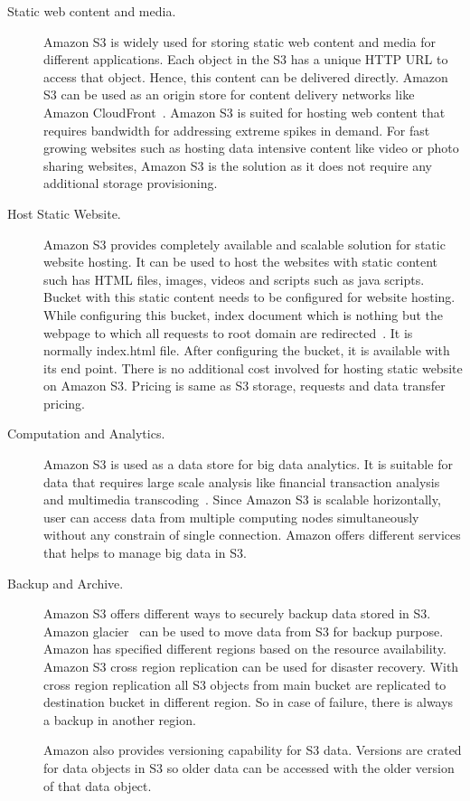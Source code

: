 \begin{description}
\item [Static web content and media.] Amazon S3 is widely used for
  storing static web content and media for different
  applications. Each object in the S3 has a unique HTTP URL to access
  that object. Hence, this content can be delivered directly. Amazon
  S3 can be used as an origin store for content delivery networks like
  Amazon CloudFront~\cite{hid-sp18-420-amazon-cloudfront}.  Amazon S3
  is suited for hosting web content that requires bandwidth for
  addressing extreme spikes in demand. For fast growing websites such
  as hosting data intensive content like video or photo sharing
  websites, Amazon S3 is the solution as it does not require any
  additional storage provisioning.



\item [Host Static Website.] Amazon S3 provides completely available
  and scalable solution for static website hosting. It can be used to
  host the websites with static content such has HTML files, images,
  videos and scripts such as java scripts.  Bucket with this static
  content needs to be configured for website hosting.  While
  configuring this bucket, index document which is nothing but the
  webpage to which all requests to root domain are
  redirected~\cite{hid-sp18-420-amazon-S3-details}. It is normally
  index.html file.  After configuring the bucket, it is available with
  its end point. There is no additional cost involved for hosting
  static website on Amazon S3. Pricing is same as S3 storage, requests
  and data transfer pricing.


\item [Computation and Analytics.] Amazon S3 is used as a data store
  for big data analytics. It is suitable for data that requires large
  scale analysis like financial transaction analysis and multimedia
  transcoding~\cite{hid-sp18-420-amazon-S3-FAQ}.  Since Amazon S3 is
  scalable horizontally, user can access data from multiple computing
  nodes simultaneously without any constrain of single connection.
  Amazon offers different services that helps to manage big data in
  S3.


\item [Backup and Archive.] Amazon S3 offers different ways to
  securely backup data stored in S3. Amazon
  glacier~\cite{hid-sp18-420-amazon-glacier} can be used to move data
  from S3 for backup purpose. Amazon has specified different regions
  based on the resource availability. Amazon S3 cross region
  replication can be used for disaster recovery. With cross region
  replication all S3 objects from main bucket are replicated to
  destination bucket in different region. So in case of failure, there
  is always a backup in another region.

  Amazon also provides versioning capability for S3 data. Versions are
  crated for data objects in S3 so older data can be accessed with the
  older version of that data object.

\end{description}

